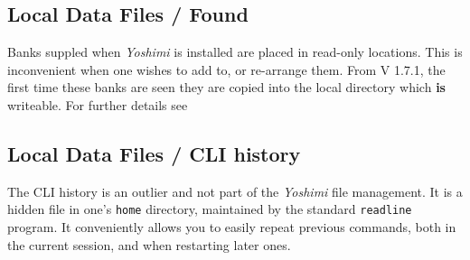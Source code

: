 \subsection{Local Data Files / Found}
\label{subsec:local_data_found}
   Banks suppled when \textsl{Yoshimi} is installed are placed in read-only
   locations. This is inconvenient when one wishes to add to, or re-arrange
   them. From V 1.7.1, the first time these banks are seen they are copied into
   the local directory which \textbf{is} writeable. For further details see

\subsection{Local Data Files / CLI history}
\label{subsec:local_data_cli_history}
   The CLI history is an outlier and not part of the \textsl{Yoshimi} file
   management. It is a hidden file in one's \texttt{home} directory, maintained
   by the standard \texttt{readline} program.
   It conveniently allows you to easily repeat previous commands, both in the
   current session, and when restarting later ones.


